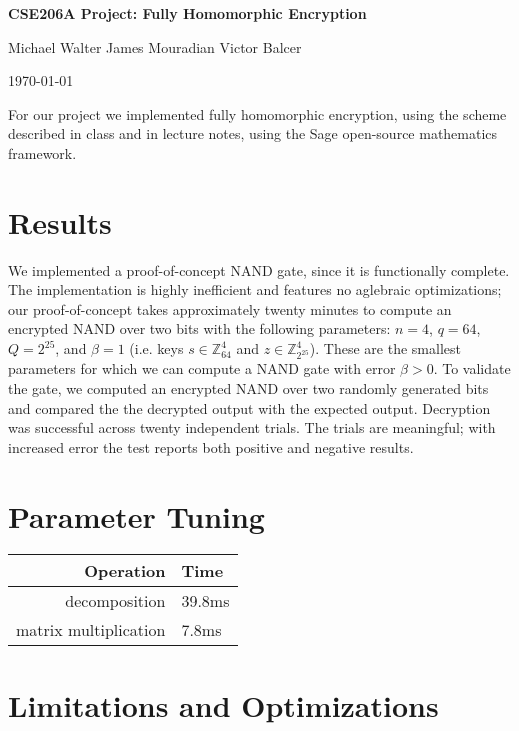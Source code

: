 \documentclass{article}
\begin{document}
\centerline{\LARGE{\bf{CSE206A Project: Fully Homomorphic Encryption}}}
\vspace{12.0pt}
\centerline{Michael Walter \hspace{0.1in} James Mouradian \hspace{0.1in} Victor Balcer}
\vspace{4.0pt}
\centerline{\today}

For our project we implemented fully homomorphic encryption, using the scheme
described in class and in lecture notes, using the Sage open-source mathematics
framework.

\section{Results}

We implemented a proof-of-concept NAND gate, since it is functionally complete.
The implementation is highly inefficient and features no aglebraic
optimizations; our proof-of-concept takes approximately twenty minutes to
compute an encrypted NAND over two bits with the following parameters: $n=4$,
$q=64$, $Q=2^{25}$, and $\beta = 1$ (i.e. keys $s\in \mathbb{Z}_{64}^4$ and
$z\in\mathbb{Z}_{2^{25}}^4$). These are the smallest parameters for which we
can compute a NAND gate with error $\beta > 0$. To validate the gate, we
computed an encrypted NAND over two randomly generated bits and compared the
the decrypted output with the expected output. Decryption was successful across
twenty independent trials. The trials are meaningful; with increased error
the test reports both positive and negative results.

\section{Parameter Tuning}


\begin{tabular}{r   l}
\textbf{Operation} & \textbf{Time} \\
\hline
decomposition & 39.8ms \\
matrix multiplication & 7.8ms \\
\end{tabular}


\section{Limitations and Optimizations}
\end{document}
